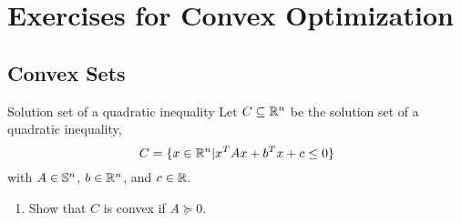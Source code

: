 \chapter{Exercises for Convex Optimization}

\section{Convex Sets}

\begin{exercise}{Solution set of a quadratic inequality}
	Let \(C\subseteq\mathbb{R}^{n}\) be the solution set of a quadratic inequality,
	\begin{equation*}
		C=\{x\in\mathbb{R}^{n}\vert x^{T}Ax+b^{T}x+c\leq 0\}
	\end{equation*}
	with \(A\in\mathbb{S}^{n}\), \(b\in\mathbb{R}^{n}\), and \(c\in\mathbb{R}\).
	\begin{enumerate}
		\item Show that \(C\) is convex if \(A\succeq 0\).
	\end{enumerate}
\end{exercise}

